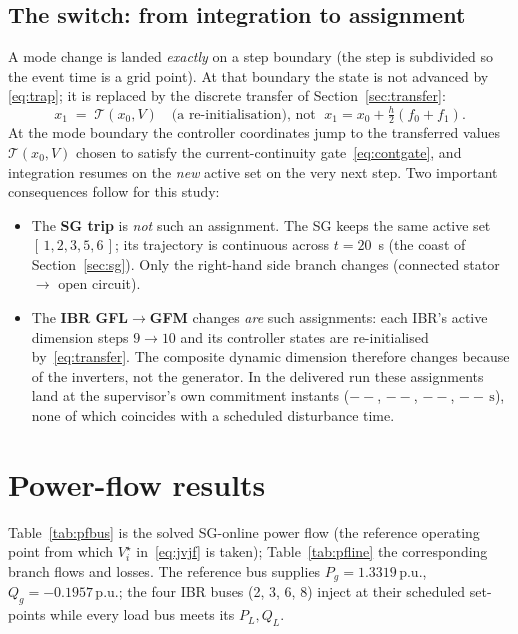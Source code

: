 \documentclass[12pt,a4paper]{article}
\theoremstyle{remark}
\newcommand{\pu}{\,\mathrm{p.u.}}
\newcommand{\second}{\,\mathrm{s}}
\newcommand{\NewRunAugmentOne}{--}\newcommand{\NewRunAugmentTwo}{--}%
\newcommand{\NewRunAugmentThree}{--}\newcommand{\NewRunAugmentFour}{--}%
\begin{document}
\subsection{The switch: from integration to assignment}\label{sec:ts-switch}
A mode change is landed \emph{exactly} on a step boundary (the step is subdivided
so the event time is a grid point). At that boundary the state is not advanced by
\eqref{eq:trap}; it is replaced by the discrete transfer of
Section~\ref{sec:transfer}:
\begin{equation}
  x_1 \;=\; \mathcal{T}(x_0,V)\quad\text{(a re-initialisation), not }
  \;x_1=x_0+\tfrac{h}{2}(f_0+f_1).
  \label{eq:assign}
\end{equation}
At the mode boundary the controller coordinates jump to the transferred values
$\mathcal T(x_0,V)$ chosen to satisfy the current-continuity
gate~\eqref{eq:contgate}, and integration resumes on the \emph{new} active set on
the very next step. Two important consequences follow for this study:
\begin{itemize}\itemsep2pt
  \item The \textbf{SG trip} is \emph{not} such an assignment. The SG keeps the
        same active set $[\,1,2,3,5,6\,]$; its trajectory is continuous across
        $t=20$~s (the coast of Section~\ref{sec:sg}). Only the right-hand side
        branch changes (connected stator $\to$ open circuit).
  \item The \textbf{IBR GFL$\to$GFM} changes \emph{are} such assignments: each
        IBR's active dimension steps $9\to10$ and its controller states are
        re-initialised by~\eqref{eq:transfer}. The composite dynamic dimension
        therefore changes because of the inverters, not the generator. In the
        delivered run these assignments land at the supervisor's own commitment
        instants ($\NewRunAugmentOne$, $\NewRunAugmentTwo$,
        $\NewRunAugmentThree$, $\NewRunAugmentFour\second$), none of which
        coincides with a scheduled disturbance time.
\end{itemize}

\section{Power-flow results}\label{sec:pf}
Table~\ref{tab:pfbus} is the solved SG-online power flow (the reference operating
point from which $V_i^{\star}$ in~\eqref{eq:jvjf} is taken); Table~\ref{tab:pfline}
the corresponding branch flows and losses. The reference bus supplies
$P_g=1.3319\pu$, $Q_g=-0.1957\pu$; the four IBR buses (2, 3, 6, 8) inject at
their scheduled set-points while every load bus meets its $P_L,Q_L$.
\end{document}
